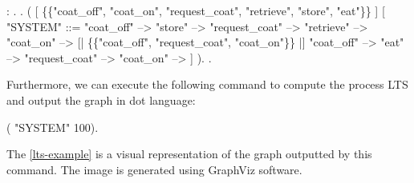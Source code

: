 \begin{coqdoccode}
	\coqdocnoindent
	  : .\coqdoceol
	\coqdocnoindent
	.\coqdoceol
	\coqdocindent{1.00em}
	 (\coqdoceol
	\coqdocindent{2.00em}
	\coqdoceol
	\coqdocindent{2.00em}
	[  \{\{"coat\_off", "coat\_on", "request\_coat", "retrieve", "store", "eat"\}\} ]\coqdoceol
	\coqdocindent{2.00em}
	[ "SYSTEM" ::=\coqdoceol
	\coqdocindent{3.00em}
	"coat\_off" --> "store" --> "request\_coat" --> "retrieve" --> "coat\_on" --> \coqdoceol
	\coqdocindent{3.00em}
	[| \{\{"coat\_off", "request\_coat", "coat\_on"\}\} |]\coqdoceol
	\coqdocindent{3.00em}
	"coat\_off" --> "eat" --> "request\_coat" --> "coat\_on" -->  ]\coqdoceol
	\coqdocindent{1.00em}
	).\coqdoceol
	\coqdocnoindent
	.\coqdoceol
\end{coqdoccode}

Furthermore, we can execute the following command to compute the process LTS and output the graph in dot language:

\begin{coqdoccode}
	\coqdocnoindent
	  (  "SYSTEM" 100).\coqdoceol
\end{coqdoccode}

The \autoref{lts-example} is a visual representation of the graph outputted by this command. The image is generated using GraphViz software.

